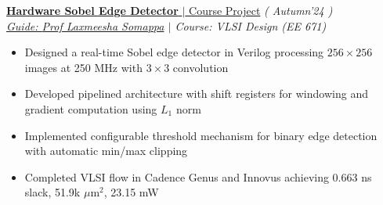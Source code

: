 \begin{flushleft}
	\vspace{-6pt}
	\href{https://github.com/bgics/ee671/tree/main/project2}{\textbf{Hardware Sobel Edge Detector} $|$ Course Project}
	\hfill{ \small{\it( Autumn'24 )}}
	\\

	\hspace{-3pt}\textit{ \href{https://www.ee.iitb.ac.in/web/people/laxmeesha-somappa/}{Guide: {Prof Laxmeesha Somappa}}
	$|$ Course: VLSI Design (EE 671)} \\
	\vspace{-7pt}

	\begin{itemize}[itemsep = -0.75 mm, leftmargin=*]
		\item Designed a real-time Sobel edge detector in Verilog processing $256 \times 256$ images at 250 MHz with $3 \times 3$ convolution
		\item Developed pipelined architecture with shift registers for windowing and gradient computation using $L_1$ norm
		\item Implemented configurable threshold mechanism for binary edge detection with automatic min/max clipping
		\item Completed VLSI flow in Cadence Genus and Innovus achieving 0.663 ns slack, 51.9k $\mu$m$^2$, 23.15 mW
	\end{itemize}
\end{flushleft}
